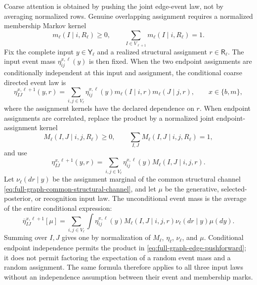 Coarse attention is obtained by pushing the joint edge-event law, not by
averaging normalized rows. Genuine overlapping assignment requires a
normalized membership Markov kernel
\begin{equation}
m_\ell(I\mid i,R_\ell)\geq0,
\qquad
\sum_{I\in V_{\ell+1}}m_\ell(I\mid i,R_\ell)=1.
\label{eq:full-graph-membership-kernel}
\end{equation}
Fix the complete input $y\in\mathsf Y_\ell$ and a realized structural
assignment $r\in\mathsf R_\ell$. The input event mass
$\eta_{ij}^{x,\ell}(y)$ is then fixed. When the two endpoint assignments
are conditionally independent at this input and assignment, the conditional
coarse directed event law is
\begin{equation}
\eta_{IJ}^{x,\ell+1}(y,r)
=\sum_{i,j\in V_\ell}\eta_{ij}^{x,\ell}(y)
m_\ell(I\mid i,r)m_\ell(J\mid j,r),
\qquad x\in\{b,m\},
\label{eq:full-graph-edge-pushforward}
\end{equation}
where the assignment kernels have the declared dependence on $r$. When
endpoint assignments are correlated, replace the product by a normalized
joint endpoint-assignment kernel
\begin{equation}
M_\ell(I,J\mid i,j,R_\ell)\geq0,
\qquad
\sum_{I,J}M_\ell(I,J\mid i,j,R_\ell)=1,
\label{eq:full-graph-joint-endpoint-kernel}
\end{equation}
and use
\begin{equation}
\eta_{IJ}^{x,\ell+1}(y,r)
=\sum_{i,j\in V_\ell}\eta_{ij}^{x,\ell}(y)
M_\ell(I,J\mid i,j,r).
\label{eq:full-graph-correlated-edge-pushforward}
\end{equation}
Let $\nu_\ell(dr\mid y)$ be the assignment marginal of the common structural
channel \eqref{eq:full-graph-common-structural-channel}, and let $\mu$ be the
generative, selected-posterior, or recognition input law. The unconditional
event mass is the average of the entire conditional expression:
\begin{equation}
\overline\eta_{IJ}^{x,\ell+1}[\mu]
=\sum_{i,j\in V_\ell}\int
\eta_{ij}^{x,\ell}(y)M_\ell(I,J\mid i,j,r)
\nu_\ell(dr\mid y)\mu(dy).
\label{eq:full-graph-unconditional-edge-pushforward}
\end{equation}
Summing over $I,J$ gives one by normalization of $M_\ell$, $\eta_\ell$,
$\nu_\ell$, and $\mu$. Conditional endpoint independence permits the
product in \eqref{eq:full-graph-edge-pushforward}; it does not permit
factoring the expectation of a random event mass and a random assignment.
The same formula therefore applies to all three input laws without an
independence assumption between their event and membership marks.

